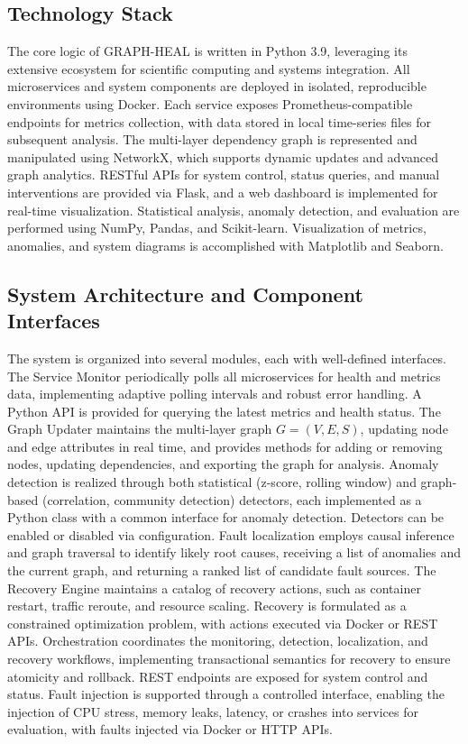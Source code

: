 \documentclass[11pt,twocolumn]{article}
\begin{document}
\subsection{ Technology Stack}
The core logic of GRAPH-HEAL is written in Python 3.9, leveraging its extensive ecosystem for scientific computing and systems integration. All microservices and system components are deployed in isolated, reproducible environments using Docker. Each service exposes Prometheus-compatible endpoints for metrics collection, with data stored in local time-series files for subsequent analysis. The multi-layer dependency graph is represented and manipulated using NetworkX, which supports dynamic updates and advanced graph analytics. RESTful APIs for system control, status queries, and manual interventions are provided via Flask, and a web dashboard is implemented for real-time visualization. Statistical analysis, anomaly detection, and evaluation are performed using NumPy, Pandas, and Scikit-learn. Visualization of metrics, anomalies, and system diagrams is accomplished with Matplotlib and Seaborn.

\subsection{System Architecture and Component Interfaces}
The system is organized into several modules, each with well-defined interfaces. The Service Monitor periodically polls all microservices for health and metrics data, implementing adaptive polling intervals and robust error handling. A Python API is provided for querying the latest metrics and health status. The Graph Updater maintains the multi-layer graph $G = (V, E, S)$, updating node and edge attributes in real time, and provides methods for adding or removing nodes, updating dependencies, and exporting the graph for analysis. Anomaly detection is realized through both statistical (z-score, rolling window) and graph-based (correlation, community detection) detectors, each implemented as a Python class with a common interface for anomaly detection. Detectors can be enabled or disabled via configuration. Fault localization employs causal inference and graph traversal to identify likely root causes, receiving a list of anomalies and the current graph, and returning a ranked list of candidate fault sources. The Recovery Engine maintains a catalog of recovery actions, such as container restart, traffic reroute, and resource scaling. Recovery is formulated as a constrained optimization problem, with actions executed via Docker or REST APIs. Orchestration coordinates the monitoring, detection, localization, and recovery workflows, implementing transactional semantics for recovery to ensure atomicity and rollback. REST endpoints are exposed for system control and status. Fault injection is supported through a controlled interface, enabling the injection of CPU stress, memory leaks, latency, or crashes into services for evaluation, with faults injected via Docker or HTTP APIs.
\end{document}
